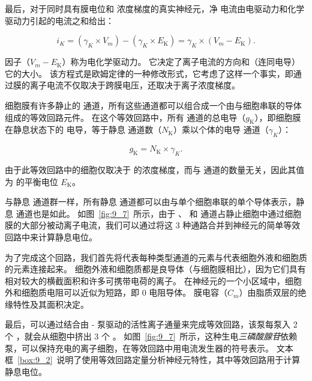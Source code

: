 最后，对于同时具有膜电位和  浓度梯度的真实神经元，净  电流由电驱动力和化学驱动力引起的电流之和给出：

\begin{equation}
	i_K = (\gamma_K \times V_m) - 
		(\gamma_K \times E_\text{K}) =
		\gamma_K \times (V_m - E_\text{K}).
\end{equation}


因子（$V_m - E_\text{K}$）称为电化学驱动力。
它决定了离子电流的方向和（连同电导）它的大小。
该方程式是欧姆定律的一种修改形式，它考虑了这样一个事实，即通过膜的离子电流不仅取决于跨膜电压，还取决于离子浓度梯度。


细胞膜有许多静止的  通道，所有这些通道都可以组合成一个由与细胞串联的导体组成的等效回路元件。
在这个等效回路中，所有  通道的总电导（$g_\text{K}$），即细胞膜在静息状态下的  电导，等于静息  通道数（$N_\text{K}$）乘以个体的电导 通道（$\gamma_K$）：

\begin{equation}
	g_\text{K} = N_\text{K} \times \gamma_K.
\end{equation}


由于此等效回路中的细胞仅取决于  的浓度梯度，而与  通道的数量无关，因此其值为  的平衡电位 $E_\text{K}$。


与静息  通道群一样，所有静息  通道都可以由与单个细胞串联的单个导体表示，静息  通道也是如此。
如图~\ref{fig:9_7}~所示，由于 、 和  通道占静止细胞中通过细胞膜的大部分被动离子电流，我们可以通过将这 3 种通路合并到神经元的简单等效回路中来计算静息电位。


为了完成这个回路，我们首先将代表每种类型通道的元素与代表细胞外液和细胞质的元素连接起来。
细胞外液和细胞质都是良导体（与细胞膜相比），因为它们具有相对较大的横截面积和许多可携带电荷的离子。
在神经元的一个小区域中，细胞外和细胞质电阻可以近似为短路，即 0 电阻导体。
膜电容（$C_m$）由脂质双层的绝缘特性及其面积决定。


最后，可以通过结合由 - 泵驱动的活性离子通量来完成等效回路，该泵每泵入 2 个 ，就会从细胞中挤出 3 个 。
如图~\ref{fig:9_7}~所示，这种生电\textit{三磷酸腺苷}依赖泵，可以保持充电的离子细胞，在等效回路中用电流发生器的符号表示。
文本框~\ref{box:9_2}~说明了使用等效回路定量分析神经元特性，其中等效回路用于计算静息电位。


